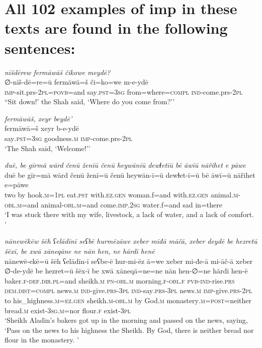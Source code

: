 \chapter{All 102 examples of imp in these texts are found in the following sentences:}

\ea \label{ZQ.4}
\textit{nīšdērew fermāwāš čikowe meydē?} \\ 
\gll ∅-nīš-dē=re=ū fermāwā=š či=ko=we m-e-ydē \\ 
 \textsc{imp-}sit.prs-\textsc{2pl}\textsc{=\textsc{povb}}=and say\textsc{.pst}\textsc{=3sg} from=where\textsc{=compl} \textsc{ind-}come.prs-\textsc{2pl} \\ 
\glt ``Sit down!' the Shah said, ‘Where do you come from?’'
\z 
 
\ea \label{ZQ.6}
\textit{fermāwāš, xeyr beydē’} \\ 
\gll fermāwā=š xeyr b-e-ydē \\ 
 say\textsc{.pst}\textsc{=3sg} goodness\textsc{.m} \textsc{imp-}come.prs-\textsc{2pl} \\ 
\glt `The Shah said, ‘Welcome!’'
\z 
 
\ea \label{ZQ.16}
\textit{duē, be gīrmā wārd čenū ženīū čenū heywānīū dewɫetīū bē āwīū nāřihet e pāwe} \\ 
\gll duē be gīr=mā wārd čenū ženī=ū čenū heywān-ī=ū dewɫet-ī=ū bē āwī=ū nāřihet e=pāwe \\ 
 two by hook\textsc{.m}\textsc{=\textsc{1pl}} eat\textsc{.pst} with\textsc{.ez.gen} woman.f=and with\textsc{.ez.gen} animal\textsc{.m}\textsc{-obl}\textsc{.m}=and animal\textsc{-obl}\textsc{.m}=and come\textsc{.imp}\textsc{.\textsc{2sg}} water.f=and sad in=there \\ 
\glt `I was stuck there with my wife, livestock, a lack of water, and a lack of comfort. '
\z 
 
\ea \label{HB.2}
\textit{nānewēkēw šēh ʕelādīnī seʕbē hurmēzāwe xeber miđā māčā, xeber deydē be hezretū šēxī, be xwā xāneqāne ne nān hen, ne hārdī henē} \\ 
\gll nānewē-ekē=ū šēh ʕelādīn-ī seʕbe-ē hur-mi-ēz ā=we xeber mi-đe-ā mi-āč-ā xeber ∅-de-ydē be hezret=ū šēx-ī be xwā xāneqā=ne=ne nān hen-∅=ne hārdī hen-ē \\ 
 baker\textsc{\textsc{.f}}\textsc{-def}\textsc{.dir}\textsc{.pl}=and sheikh\textsc{.m} \textsc{pn}\textsc{-obl}\textsc{.m} morning\textsc{\textsc{.f}}\textsc{-obl}\textsc{\textsc{.f}} \textsc{pvb-}\textsc{ind-}rise\textsc{.prs} \textsc{dem.dist}\textsc{=compl} news\textsc{.m} \textsc{ind-}give\textsc{.prs}\textsc{-3pl} \textsc{ind-}say\textsc{.prs}\textsc{-3pl} news\textsc{.m} \textsc{imp-}give\textsc{.prs}\textsc{-2pl} to his\_highness\textsc{.m}\textsc{=ez}\textsc{.gen} sheikh\textsc{.m}\textsc{-obl}\textsc{.m} by God\textsc{.m} monastery\textsc{.m}\textsc{=\textsc{post}}=neither bread\textsc{.m} exist\textsc{-3sg}\textsc{.m}=nor flour\textsc{\textsc{.f}} exist\textsc{-3pl} \\ 
\glt `Sheikh Aladin’s bakers got up in the morning and passed on the news, saying, ‘Pass on the news to his highness the Sheikh. By God, there is neither bread nor flour in the monastery. '
\z 
 
